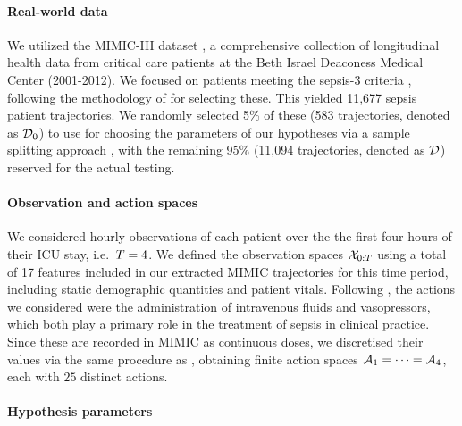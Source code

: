\paragraph{Real-world data}

We utilized the MIMIC-III dataset \cite{mimic}, a comprehensive collection of longitudinal health data from critical care patients at the Beth Israel Deaconess Medical Center (2001-2012).
We focused on patients meeting the sepsis-3 criteria \cite{sepsis-criteria}, following the methodology of \cite{ai-clinician} for selecting these.
This yielded 11,677 sepsis patient trajectories.
We randomly selected 5\% of these (583 trajectories, denoted as $\mathcal{D}_0$) to use for choosing the parameters of our hypotheses via a sample splitting approach \cite{cox1975note}, with the remaining 95\% (11,094 trajectories, denoted as $\mathcal{D}$) reserved for the actual testing.

%

\paragraph{Observation and action spaces}

%
%

%

%


We considered hourly observations of each patient over the the first four hours of their ICU stay, i.e.\ $T = 4$.
We defined the observation spaces $\mathcal{X}_{0:T}$ using a total of 17 features included in our extracted MIMIC trajectories for this time period, including static demographic quantities and patient vitals.
%
%
Following \cite{ai-clinician}, the actions we considered were the administration of intravenous fluids and vasopressors, which both play a primary role in the treatment of sepsis in clinical practice.
Since these are recorded in MIMIC as continuous doses, we discretised their values via the same procedure as \cite{ai-clinician}, obtaining finite action spaces $\mathcal{A}_1 = \cdots = \mathcal{A}_4$, each with $25$ distinct actions.

%
%
%



%
%
%
%
%
%
%
%

%

%
%
%


%
%


%

\paragraph{Hypothesis parameters} 

